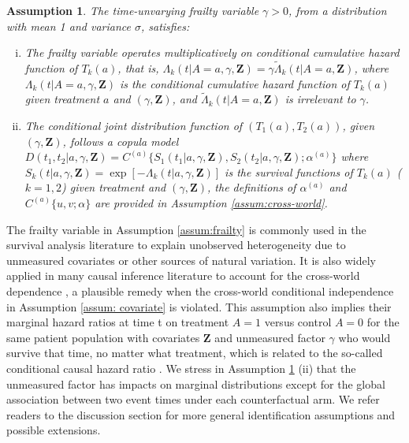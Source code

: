 \documentclass[aoas]{imsart}
\theoremstyle{plain}
\newtheorem{assum}{Assumption}
\def\red #1{{\color{red}{#1}}}
\def\bfZ{\mathbf{Z}}
\def\Pr{\operatorname{Pr}}
\begin{document}
\begin{assum}
The time-unvarying frailty variable $\gamma>0$, from a distribution with mean 1 and variance $\sigma$, satisfies:
\begin{enumerate}[(i)]
\item The frailty variable operates multiplicatively on conditional cumulative hazard function of $T_k(a)$, that is, $\Lambda_k(t|A=a,\gamma,\bfZ) = \gamma\widetilde{\Lambda}_k(t|A=a,\bfZ)$,
where $\Lambda_k(t|A=a,\gamma,\bfZ) $ is the conditional cumulative hazard function of $T_k(a)$ given treatment $a$ and $(\gamma,\bfZ)$, and $\widetilde{\Lambda}_k(t|A=a,\bfZ)$ is irrelevant to $\gamma$.
\item The conditional joint distribution function of $(T_1(a),T_2(a))$, given $(\gamma,\bfZ)$, follows a copula model 
$D(t_1,t_2|a,\gamma,\bfZ) 
= C^{(a)}\{S_1(t_1|a,\gamma,\bfZ),S_2(t_2|a,\gamma,\bfZ);\alpha^{(a)}\}$ %
where $S_k(t|a,\gamma,\bfZ)=\exp[-\Lambda_k(t|a,\gamma,\bfZ)]$ is the survival functions of $T_k(a)$ ($k=1,2$) given treatment and $(\gamma,\bfZ)$, the definitions of $\alpha^{(a)}$ and $C^{(a)}\{u,v;\alpha\}$ are provided in Assumption \ref{assum:cross-world}.
\end{enumerate}
\label{assum:cross-world_frailty}
\end{assum}

The frailty variable in Assumption \ref{assum:frailty} is commonly used in the survival analysis literature to explain unobserved heterogeneity due to unmeasured covariates or other sources of natural variation.  It is also widely applied in many causal inference literature to account for the cross-world dependence \citep{aalen2015does,martinussen2020subtleties,axelrod2022sensitivity}, a plausible remedy when the cross-world conditional independence in Assumption \ref{assum: covariate} is violated. 
This assumption also implies their marginal hazard ratios at time t on treatment $A=1$ versus control $A=0$ for the same patient population with covariates $\bfZ$ and unmeasured factor $\gamma$ who would survive that time, no matter what treatment, which is related to the so-called conditional causal hazard ratio \citep{martinussen2020subtleties}.
We stress in Assumption \ref{assum:cross-world_frailty} (ii) that the unmeasured factor has impacts on marginal distributions except for the global association between two event times under each counterfactual arm. We refer readers to the discussion section for more general identification assumptions and possible extensions.
\end{document}
